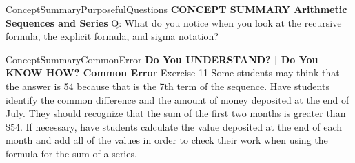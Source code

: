 \documentclass{article}
\newenvironment{te-addendum}[2]{}{}     %
\newcommand{\answer}[1]{}               %
\begin{document}
\begin{te-addendum}{ConceptSummary}{PurposefulQuestions}
\textbf{CONCEPT SUMMARY Arithmetic Sequences and Series}
Q: What do you notice when you look at the recursive formula, the explicit formula, and sigma notation?
\answer{Each formula uses the values (n), (a_1), and (a_n).}
\end{te-addendum}
\begin{te-addendum}{ConceptSummary}{CommonError}
\textbf{Do You UNDERSTAND? | Do You KNOW HOW? Common Error}
Exercise 11 Some students may think that the answer is 54 because that is the 7th term of the sequence. Have students identify the common difference and the amount of money deposited at the end of July. They should recognize that the sum of the first two months is greater than \$54. If necessary, have students calculate the value deposited at the end of each month and add all of the values in order to check their work when using the formula for the sum of a series.
\end{te-addendum}
\end{document}
